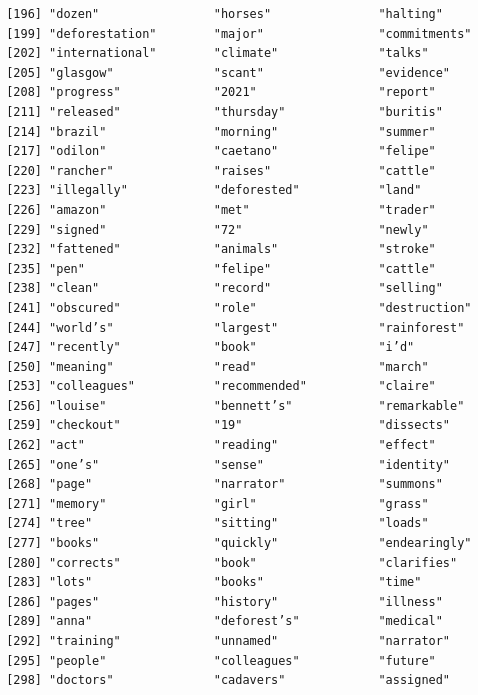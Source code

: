 \documentclass[
  letterpaper,
  DIV=11,
  numbers=noendperiod]{scrartcl}
\begin{document}
\begin{verbatim}
 [196] "dozen"                "horses"               "halting"             
 [199] "deforestation"        "major"                "commitments"         
 [202] "international"        "climate"              "talks"               
 [205] "glasgow"              "scant"                "evidence"            
 [208] "progress"             "2021"                 "report"              
 [211] "released"             "thursday"             "buritis"             
 [214] "brazil"               "morning"              "summer"              
 [217] "odilon"               "caetano"              "felipe"              
 [220] "rancher"              "raises"               "cattle"              
 [223] "illegally"            "deforested"           "land"                
 [226] "amazon"               "met"                  "trader"              
 [229] "signed"               "72"                   "newly"               
 [232] "fattened"             "animals"              "stroke"              
 [235] "pen"                  "felipe"               "cattle"              
 [238] "clean"                "record"               "selling"             
 [241] "obscured"             "role"                 "destruction"         
 [244] "world’s"              "largest"              "rainforest"          
 [247] "recently"             "book"                 "i’d"                 
 [250] "meaning"              "read"                 "march"               
 [253] "colleagues"           "recommended"          "claire"              
 [256] "louise"               "bennett’s"            "remarkable"          
 [259] "checkout"             "19"                   "dissects"            
 [262] "act"                  "reading"              "effect"              
 [265] "one’s"                "sense"                "identity"            
 [268] "page"                 "narrator"             "summons"             
 [271] "memory"               "girl"                 "grass"               
 [274] "tree"                 "sitting"              "loads"               
 [277] "books"                "quickly"              "endearingly"         
 [280] "corrects"             "book"                 "clarifies"           
 [283] "lots"                 "books"                "time"                
 [286] "pages"                "history"              "illness"             
 [289] "anna"                 "deforest’s"           "medical"             
 [292] "training"             "unnamed"              "narrator"            
 [295] "people"               "colleagues"           "future"              
 [298] "doctors"              "cadavers"             "assigned"            

\end{verbatim}
\end{document}

